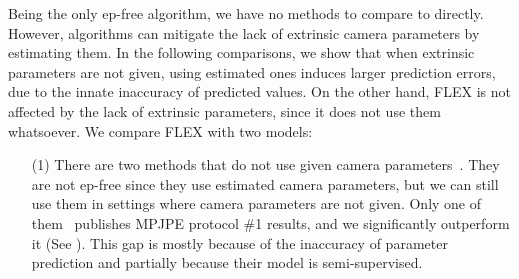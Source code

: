 Being the only ep-free algorithm, we have no methods to compare to directly. However, algorithms can mitigate the lack of extrinsic camera parameters by estimating them. In the following comparisons, we show that when extrinsic parameters are not given, using estimated ones induces larger prediction errors, due to the innate inaccuracy of predicted values. On the other hand, FLEX is not affected by the lack of extrinsic parameters, since it does not use them whatsoever.
We compare FLEX with two models:
\begin{enumerate}[nosep,leftmargin=0cm,itemindent=0.5cm,labelwidth=\itemindent,labelsep=0cm,align=left]
\item[(1)]
There are two methods that do not use given camera parameters~\cite{chu_and_pan_semisupervised,kocabas2019selfsupervised}. 
They are not ep-free since they use estimated camera parameters, but we can still use them in settings where camera parameters are not given.
Only one of them~\cite{chu_and_pan_semisupervised} publishes MPJPE protocol \#1 results, and we significantly outperform it
(See ). 
This gap is mostly because of the inaccuracy of parameter prediction and partially because their model is semi-supervised. 
    

\end{enumerate}

